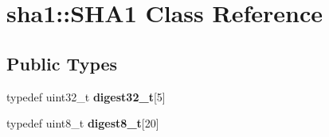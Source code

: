 \hypertarget{classsha1_1_1SHA1}{}\section{sha1\+:\+:S\+H\+A1 Class Reference}
\label{classsha1_1_1SHA1}
\subsection*{Public Types}
\begin{DoxyCompactItemize}
\item 
\mbox{\label{classsha1_1_1SHA1_a15f384f39d235a8912d5042dc920595f}} 
typedef uint32\+\_\+t {\bfseries digest32\+\_\+t}\mbox{[}5\mbox{]}
\item 
\mbox{\label{classsha1_1_1SHA1_a62b6c7838c4cdcb81700a6cc64fde994}} 
typedef uint8\+\_\+t {\bfseries digest8\+\_\+t}\mbox{[}20\mbox{]}
\end{DoxyCompactItemize}
